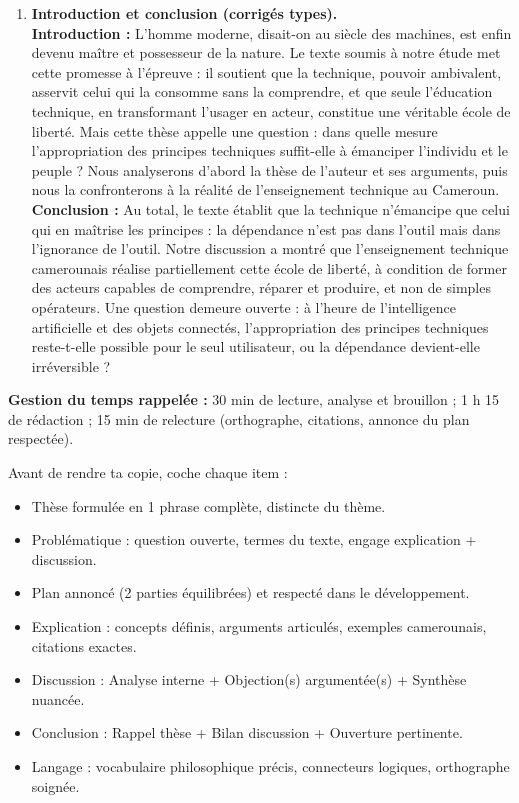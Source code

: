 \documentclass[11pt]{article}
\begin{document}
\begin{exoresolu}
\begin{enumerate}
\item \textbf{Introduction et conclusion (corrigés types).}\\
\textbf{Introduction :} \og L'homme moderne, disait-on au siècle des machines, est enfin devenu maître et possesseur de la nature. Le texte soumis à notre étude met cette promesse à l'épreuve : il soutient que la technique, pouvoir ambivalent, asservit celui qui la consomme sans la comprendre, et que seule l'éducation technique, en transformant l'usager en acteur, constitue une véritable école de liberté. Mais cette thèse appelle une question : dans quelle mesure l'appropriation des principes techniques suffit-elle à émanciper l'individu et le peuple ? Nous analyserons d'abord la thèse de l'auteur et ses arguments, puis nous la confronterons à la réalité de l'enseignement technique au Cameroun. \fg\\
\textbf{Conclusion :} Au total, le texte établit que la technique n'émancipe que celui qui en maîtrise les principes : la dépendance n'est pas dans l'outil mais dans l'ignorance de l'outil. Notre discussion a montré que l'enseignement technique camerounais réalise partiellement cette école de liberté, à condition de former des acteurs capables de comprendre, réparer et produire, et non de simples opérateurs. Une question demeure ouverte : à l'heure de l'intelligence artificielle et des objets connectés, l'appropriation des principes techniques reste-t-elle possible pour le seul utilisateur, ou la dépendance devient-elle irréversible ?
\end{enumerate}
\textbf{Gestion du temps rappelée :} 30 min de lecture, analyse et brouillon ; 1 h 15 de rédaction ; 15 min de relecture (orthographe, citations, annonce du plan respectée).
\end{exoresolu}

\begin{savaistu}
Avant de rendre ta copie, coche chaque item :
\begin{itemize}
\item [ ] Thèse formulée en 1 phrase complète, distincte du thème.
\item [ ] Problématique : question ouverte, termes du texte, engage explication + discussion.
\item [ ] Plan annoncé (2 parties équilibrées) et respecté dans le développement.
\item [ ] Explication : concepts définis, arguments articulés, exemples camerounais, citations exactes.
\item [ ] Discussion : Analyse interne + Objection(s) argumentée(s) + Synthèse nuancée.
\item [ ] Conclusion : Rappel thèse + Bilan discussion + Ouverture pertinente.
\item [ ] Langage : vocabulaire philosophique précis, connecteurs logiques, orthographe soignée.
\end{itemize}
\end{savaistu}
\end{document}
